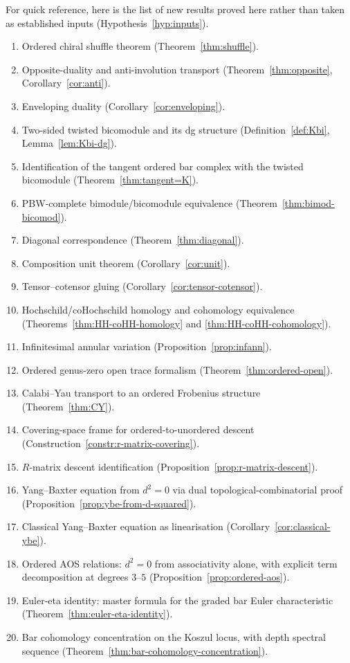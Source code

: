 For quick reference, here is the list of new results proved here rather than taken as
established inputs (Hypothesis~\ref{hyp:inputs}).

\begin{enumerate}[label=(\arabic*)]
\item Ordered chiral shuffle theorem (Theorem~\ref{thm:shuffle}).
\item Opposite-duality and anti-involution transport (Theorem~\ref{thm:opposite},
Corollary~\ref{cor:anti}).
\item Enveloping duality (Corollary~\ref{cor:enveloping}).
\item Two-sided twisted bicomodule and its dg structure (Definition~\ref{def:Kbi},
Lemma~\ref{lem:Kbi-dg}).
\item Identification of the tangent ordered bar complex with the twisted bicomodule
(Theorem~\ref{thm:tangent=K}).
\item PBW-complete bimodule/bicomodule equivalence (Theorem~\ref{thm:bimod-bicomod}).
\item Diagonal correspondence (Theorem~\ref{thm:diagonal}).
\item Composition unit theorem (Corollary~\ref{cor:unit}).
\item Tensor--cotensor gluing (Corollary~\ref{cor:tensor-cotensor}).
\item Hochschild/coHochschild homology and cohomology equivalence
(Theorems~\ref{thm:HH-coHH-homology} and \ref{thm:HH-coHH-cohomology}).
\item Infinitesimal annular variation (Proposition~\ref{prop:infann}).
\item Ordered genus-zero open trace formalism (Theorem~\ref{thm:ordered-open}).
\item Calabi--Yau transport to an ordered Frobenius structure (Theorem~\ref{thm:CY}).
\item Covering-space frame for ordered-to-unordered descent
(Construction~\ref{constr:r-matrix-covering}).
\item $R$-matrix descent identification
(Proposition~\ref{prop:r-matrix-descent}).
\item Yang--Baxter equation from $d^2=0$ via dual topological-combinatorial
proof (Proposition~\ref{prop:ybe-from-d-squared}).
\item Classical Yang--Baxter equation as linearisation
(Corollary~\ref{cor:classical-ybe}).
\item Ordered AOS relations: $d^2=0$ from associativity alone, with explicit term
decomposition at degrees $3$--$5$ (Proposition~\ref{prop:ordered-aos}).
\item Euler-eta identity: master formula for the graded bar Euler characteristic
(Theorem~\ref{thm:euler-eta-identity}).
\item Bar cohomology concentration on the Koszul locus, with depth spectral sequence
(Theorem~\ref{thm:bar-cohomology-concentration}).
\end{enumerate}

